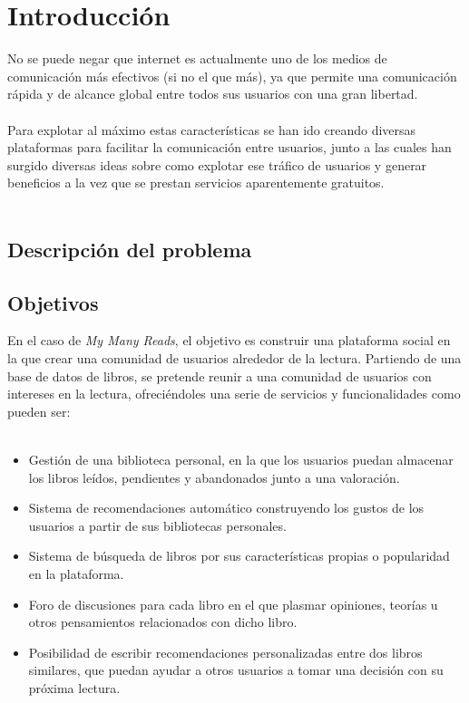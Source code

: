 \chapter{Introducción}

No se puede negar que internet es actualmente uno de los medios de comunicación más efectivos (si no el que más), ya que permite una comunicación rápida y de alcance global entre todos sus usuarios con una gran libertad.
\\\\
Para explotar al máximo estas características se han ido creando diversas plataformas para facilitar la comunicación entre usuarios, junto a las cuales han surgido diversas ideas sobre como explotar ese tráfico de usuarios y generar beneficios a la vez que se prestan servicios aparentemente gratuitos.
\\\\
\section{Descripción del problema}

\section{Objetivos}
En el caso de \textit{My Many Reads}, el objetivo es construir una plataforma social en la que crear una comunidad de usuarios alrededor de la lectura. Partiendo de una base de datos de libros, se pretende reunir a una comunidad de usuarios con intereses en la lectura, ofreciéndoles una serie de servicios y funcionalidades como pueden ser:
\\\\
\begin{itemize}
    \item Gestión de una biblioteca personal, en la que los usuarios puedan almacenar los libros leídos, pendientes y abandonados junto a una valoración.
    \item Sistema de recomendaciones automático construyendo los gustos de los usuarios a partir de sus bibliotecas personales.
    \item Sistema de búsqueda de libros por sus características propias o popularidad en la plataforma.
    \item Foro de discusiones para cada libro en el que plasmar opiniones, teorías u otros pensamientos relacionados con dicho libro.
    \item Posibilidad de escribir recomendaciones personalizadas entre dos libros similares, que puedan ayudar a otros usuarios a tomar una decisión con su próxima lectura.
\end{itemize}

